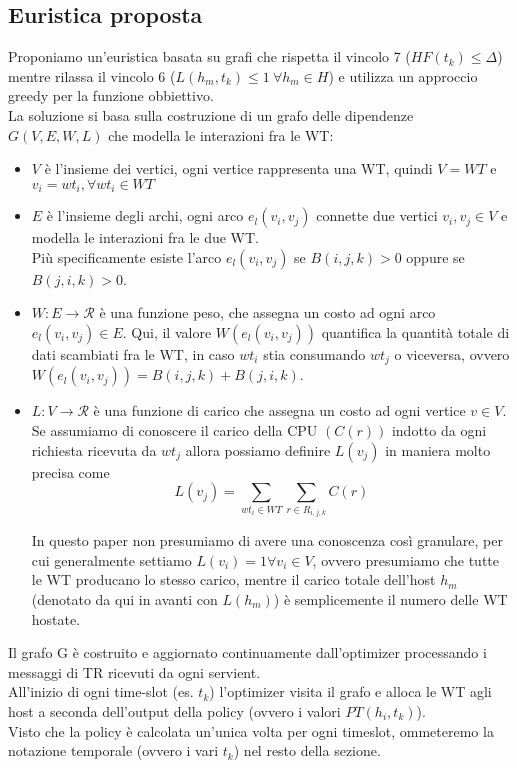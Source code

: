 \documentclass[11pt]{article}
\begin{document}
	\subsection{Euristica proposta}
	Proponiamo un'euristica basata su grafi che rispetta il vincolo 7 ($HF(t_k) \le \Delta$) mentre rilassa il vincolo 6 ($L(h_m, t_k) \le 1 \ \forall h_m \in H$) e utilizza un approccio greedy per la funzione obbiettivo. \\
	La soluzione si basa sulla costruzione di un grafo delle dipendenze $G(V,E,W,L)$ che modella le interazioni fra le WT:
	\begin{itemize}
		\item $V$ è l'insieme dei vertici, ogni vertice rappresenta una WT, quindi $V = WT$ e $v_i = wt_i, \forall wt_i \in WT$
		\item $E$ è l'insieme degli archi, ogni arco $e_l(v_i, v_j)$ connette due vertici $v_i, v_j \in V$ e modella le interazioni fra le due WT. \\
		Più specificamente esiste l'arco $e_l(v_i, v_j)$ se $B(i, j, k ) > 0$ oppure se $B(j, i, k ) > 0$.
		\item $W: E \rightarrow \mathcal{R}$ è una funzione peso, che assegna un costo ad ogni arco $e_l(v_i, v_j) \in E$. Qui, il valore $W(e_l(v_i, v_j))$ quantifica la quantità totale di dati scambiati fra le WT, in caso $wt_i$ stia consumando $wt_j$ o viceversa, ovvero $W(e_l(v_i, v_j)) = B(i, j, k) + B(j, i, k)$.
		\item $L : V \rightarrow \mathcal{R}$ è una funzione di carico che assegna un costo ad ogni vertice $v \in V$. \\
		Se assumiamo di conoscere il carico della CPU $(C(r))$ indotto da ogni richiesta ricevuta da $wt_j$ allora possiamo definire $L(v_j)$ in maniera molto precisa come 
		\[
			L(v_j) = \sum_{wt_i \in WT} \sum_{r \in R_{i, j, k}} C(r)
		\]
		
		In questo paper non presumiamo di avere una conoscenza così granulare, per cui generalmente settiamo $L(v_i) = 1 \forall v_i \in V$, ovvero presumiamo che tutte le WT producano lo stesso carico, mentre il carico totale dell'host $h_m$ (denotato da qui in avanti con $L(h_m)$) è semplicemente il numero delle WT hostate. \\
	\end{itemize}
		Il grafo G è costruito e aggiornato continuamente dall'optimizer processando i messaggi di TR ricevuti da ogni servient. \\
		All'inizio di ogni time-slot (es. $t_k$) l'optimizer visita il grafo e alloca le WT agli host a seconda dell'output della policy (ovvero i valori $PT(h_i, t_k)$). \\
		Visto che la policy è calcolata un'unica volta per ogni timeslot, ommeteremo la notazione temporale (ovvero i vari $t_k$) nel resto della sezione.\\
		
\end{document}
